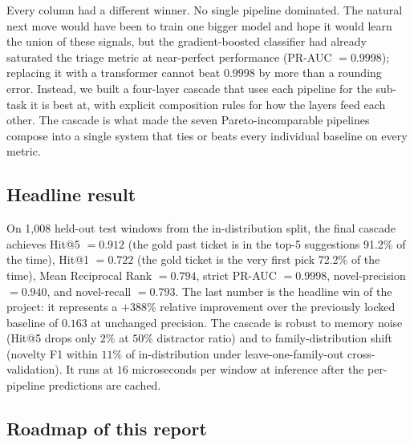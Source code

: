 Every column had a different winner. No single pipeline dominated. The natural next move would have been to train one bigger model and hope it would learn the union of these signals, but the gradient-boosted classifier had already saturated the triage metric at near-perfect performance (PR-AUC $= 0.9998$); replacing it with a transformer cannot beat $0.9998$ by more than a rounding error. Instead, we built a four-layer cascade that uses each pipeline for the sub-task it is best at, with explicit composition rules for how the layers feed each other. The cascade is what made the seven Pareto-incomparable pipelines compose into a single system that ties or beats every individual baseline on every metric.

\subsection{Headline result}

On 1{,}008 held-out test windows from the in-distribution split, the final cascade achieves Hit@5 $= 0.912$ (the gold past ticket is in the top-5 suggestions 91.2\% of the time), Hit@1 $= 0.722$ (the gold ticket is the very first pick 72.2\% of the time), Mean Reciprocal Rank $= 0.794$, strict PR-AUC $= 0.9998$, novel-precision $= 0.940$, and novel-recall $= 0.793$. The last number is the headline win of the project: it represents a $+388\%$ relative improvement over the previously locked baseline of $0.163$ at unchanged precision. The cascade is robust to memory noise (Hit@5 drops only $2\%$ at $50\%$ distractor ratio) and to family-distribution shift (novelty F1 within $11\%$ of in-distribution under leave-one-family-out cross-validation). It runs at $16$ microseconds per window at inference after the per-pipeline predictions are cached.

\subsection{Roadmap of this report}

